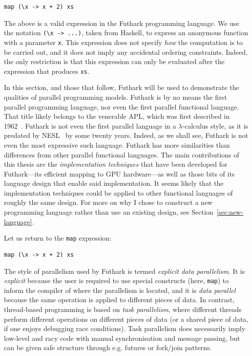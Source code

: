 \begin{lstlisting}
map (\x -> x + 2) xs
\end{lstlisting}

The above is a valid expression in the Futhark programming language.
We use the notation \lstinline{(\x -> ...)}, taken from Haskell, to
express an anonymous function with a parameter \lstinline{x}.  This
expression does not specify \textit{how} the computation is to be
carried out, and it does not imply any accidental ordering
constraints.  Indeed, the only restriction is that this expression can
only be evaluated after the expression that produces \lstinline{xs}.

In this section, and those that follow, Futhark will be used to
demonstrate the qualities of parallel programming models.  Futhark is
by no means the first parallel programming language, nor even the
first parallel functional language.  That title likely belongs to the
venerable APL, which was first described in 1962~\cite{iversonbook}.
Futhark is not even the first parallel language in a
$\lambda$-calculus style, as it is predated by
NESL~\cite{BlellochCACM96NESL} by some twenty years.  Indeed, as we
shall see, Futhark is not even the most expressive such language.
Futhark has more similarities than differences from other parallel
functional languages.  The main contributions of this thesis are the
\textit{implementation techniques} that have been developed for
Futhark---its efficient mapping to GPU hardware---as well as those
bits of its language design that enable said implementation.  It seems
likely that the implementation techniques could be applied to other
functional languages of roughly the same design.  For more on why I
chose to construct a new programming language rather than use an
existing design, see Section~\ref{sec:new-language}.

Let us return to the \lstinline{map} expression:

\begin{lstlisting}
map (\x -> x + 2) xs
\end{lstlisting}

The style of parallelism used by Futhark is termed \textit{explicit
  data parallelism}.  It is \textit{explicit} because the user is
required to use special constructs (here, \lstinline{map}) to inform
the compiler of where the parallelism is located, and it is
\textit{data parallel} because the same operation is applied to
different pieces of data.  In contrast, thread-based programming is
based on \textit{task parallelism}, where different threads perform
different operations on different pieces of data (or a shared piece of
data, if one enjoys debugging race conditions).  Task parallelism does
necessarily imply low-level and racy code with manual synchronisation
and message passing, but can be given safe structure through
e.g. futures or fork/join patterns.

